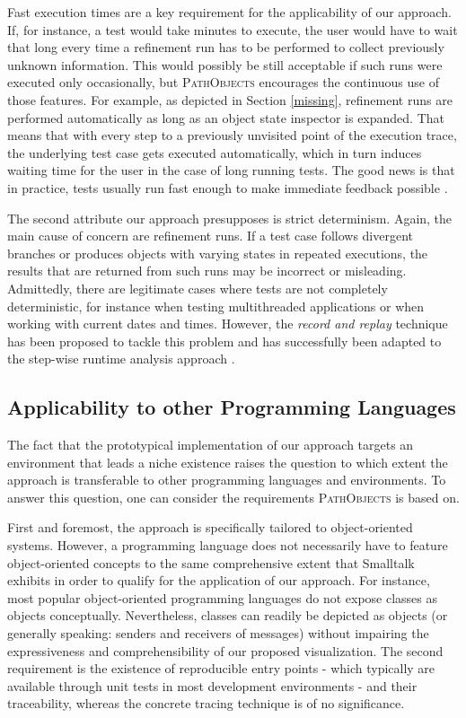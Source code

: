 Fast execution times are a key requirement for the applicability of our approach.
If, for instance, a test would take minutes to execute, the user would have to wait that long every time a refinement run has to be performed to collect previously unknown information.
This would possibly be still acceptable if such runs were executed only occasionally, but \textsc{PathObjects} encourages the continuous use of those features.
For example, as depicted in Section \ref{missing}, refinement runs are performed automatically as long as an object state inspector is expanded.
That means that with every step to a previously unvisited point of the execution trace, the underlying test case gets executed automatically, which in turn induces waiting time for the user in the case of long running tests. The good news is that in practice, tests usually run fast enough to make immediate feedback possible \cite{perscheid_immediacy_2010}.

The second attribute our approach presupposes is strict determinism.
Again, the main cause of concern are refinement runs.
If a test case follows divergent branches or produces objects with varying states in repeated executions, the results that are returned from such runs may be incorrect or misleading.
Admittedly, there are legitimate cases where tests are not completely deterministic, for instance when testing multithreaded applications or when working with current dates and times.
However, the \emph{record and replay} technique has been proposed to tackle this problem \cite{choi_deterministic_1998} and has successfully been adapted to the step-wise runtime analysis approach \cite{felgentreff_comparison_2012}.

\subsection{Applicability to other Programming Languages}
\label{s:DiscussionApplicability}
The fact that the prototypical implementation of our approach targets an environment that leads a niche existence raises the question to which extent the approach is transferable to other programming languages and environments.
To answer this question, one can consider the requirements \textsc{PathObjects} is based on.

First and foremost, the approach is specifically tailored to object-oriented systems.
However, a programming language does not necessarily have to feature object-oriented concepts to the same comprehensive extent that Smalltalk exhibits in order to qualify for the application of our approach.
For instance, most popular object-oriented programming languages do not expose classes as objects conceptually. 
Nevertheless, classes can readily be depicted as objects (or generally speaking: senders and receivers of messages) without impairing the expressiveness and comprehensibility of our proposed visualization.
The second requirement is the existence of reproducible entry points - which typically are available through unit tests in most development environments - and their traceability, whereas the concrete tracing technique is of no significance.

